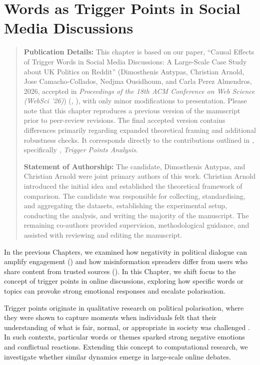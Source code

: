 \chapter{Words as Trigger Points in Social Media Discussions}
\label{ch:triggers}


\begin{quote}
\textbf{Publication Details:} This chapter is based on our paper, ``Causal Effects of Trigger Words in Social Media Discussions: A Large-Scale Case Study about UK Politics on Reddit'' (Dimosthenis Antypas, Christian Arnold, Jose Camacho-Collados, Nedjma Ousidhoum, and Carla Perez Almendros, 2026, accepted in \textit{Proceedings of the 18th ACM Conference on Web Science (WebSci '26)}) (, ), with only minor modifications to presentation. Please note that this chapter reproduces a previous version of the manuscript prior to peer-review revisions. The final accepted version contains differences primarily regarding expanded theoretical framing and additional robustness checks. It corresponds directly to the contributions outlined in , specifically , \textit{Trigger Points Analysis}.

\textbf{Statement of Authorship:} The candidate, Dimosthenis Antypas, and Christian Arnold were joint primary authors of this work. Christian Arnold introduced the initial idea and established the theoretical framework of comparison. The candidate was responsible for collecting, standardising, and aggregating the datasets, establishing the experimental setup, conducting the analysis, and writing the majority of the manuscript. The remaining co-authors provided supervision, methodological guidance, and assisted with reviewing and editing the manuscript.
\end{quote}


In the previous Chapters, we examined how negativity in political dialogue can amplify engagement () and how misinformation spreaders differ from users who share content from trusted sources (). In this Chapter, we shift focus to the concept of trigger points in online discussions, exploring how specific words or topics can provoke strong emotional responses and escalate polarisation.

Trigger points originate in qualitative research on political polarisation, where they were shown to capture moments when individuals felt that their understanding of what is fair, normal, or appropriate in society was challenged \citep{mau2023triggerpunkte}. In such contexts, particular words or themes sparked strong negative emotions and conflictual reactions. Extending this concept to computational research, we investigate whether similar dynamics emerge in large-scale online debates.

